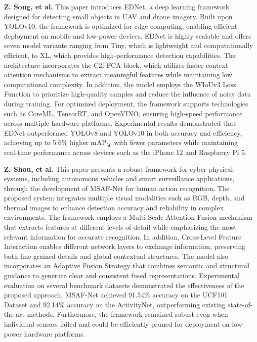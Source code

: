 \textbf{Z. Song, et al.} This paper introduces EDNet, a deep learning framework designed for detecting small objects in UAV and drone imagery. Built upon YOLOv10, the framework is optimized for edge computing, enabling efficient deployment on mobile and low-power devices. EDNet is highly scalable and offers seven model variants ranging from Tiny, which is lightweight and computationally efficient, to XL, which provides high-performance detection capabilities. The architecture incorporates the C2f-FCA block, which utilizes faster context attention mechanisms to extract meaningful features while maintaining low computational complexity. In addition, the model employs the WIoUv3 Loss Function to prioritize high-quality samples and reduce the influence of noisy data during training. For optimized deployment, the framework supports technologies such as CoreML, TensorRT, and OpenVINO, ensuring high-speed performance across multiple hardware platforms. Experimental results demonstrated that EDNet outperformed YOLOv8 and YOLOv10 in both accuracy and efficiency, achieving up to 5.6\% higher mAP$_{50}$ with fewer parameters while maintaining real-time performance across devices such as the iPhone 12 and Raspberry Pi 5. \cite{supplementary_paper_4}

\textbf{Z. Shou, et al.} This paper presents a robust framework for cyber-physical systems, including autonomous vehicles and smart surveillance applications, through the development of MSAF-Net for human action recognition. The proposed system integrates multiple visual modalities such as RGB, depth, and thermal images to enhance detection accuracy and reliability in complex environments. The framework employs a Multi-Scale Attention Fusion mechanism that extracts features at different levels of detail while emphasizing the most relevant information for accurate recognition. In addition, Cross-Level Feature Interaction enables different network layers to exchange information, preserving both fine-grained details and global contextual structures. The model also incorporates an Adaptive Fusion Strategy that combines semantic and structural guidance to generate clear and consistent fused representations. Experimental evaluation on several benchmark datasets demonstrated the effectiveness of the proposed approach. MSAF-Net achieved 91.54\% accuracy on the UCF101 Dataset and 92.14\% accuracy on the ActivityNet, outperforming existing state-of-the-art methods. Furthermore, the framework remained robust even when individual sensors failed and could be efficiently pruned for deployment on low-power hardware platforms. \cite{supplementary_paper_5} \\

